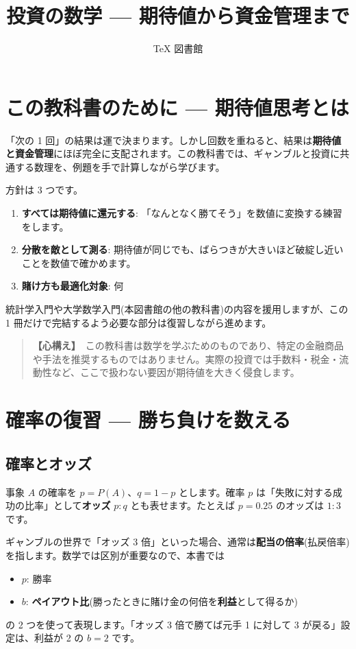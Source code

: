 \documentclass{article}
\title{投資の数学 — 期待値から資金管理まで}
\author{TeX 図書館}
\begin{document}
\section{この教科書のために — 期待値思考とは}

「次の 1 回」の結果は運で決まります。しかし回数を重ねると、結果は\textbf{期待値と資金管理}にほぼ完全に支配されます。この教科書では、ギャンブルと投資に共通する数理を、例題を手で計算しながら学びます。

方針は 3 つです。

\begin{enumerate}
\item \textbf{すべては期待値に還元する}: 「なんとなく勝てそう」を数値に変換する練習をします。
\item \textbf{分散を敵として測る}: 期待値が同じでも、ばらつきが大きいほど破綻し近いことを数値で確かめます。
\item \textbf{賭け方も最適化対象}: 何%
\end{enumerate}

統計学入門や大学数学入門(本図書館の他の教科書)の内容を援用しますが、この 1 冊だけで完結するよう必要な部分は復習しながら進めます。

\begin{quote}
\textbf{【心構え】}\ この教科書は数学を学ぶためのものであり、特定の金融商品や手法を推奨するものではありません。実際の投資では手数料・税金・流動性など、ここで扱わない要因が期待値を大きく侵食します。
\end{quote}

\section{確率の復習 — 勝ち負けを数える}

\subsection{確率とオッズ}

事象 \(A\) の確率を \(p = P(A)\)、\(q = 1 - p\) とします。確率 \(p\) は「失敗に対する成功の比率」として\textbf{オッズ} \(p : q\) とも表せます。たとえば \(p = 0.25\) のオッズは \(1:3\) です。

ギャンブルの世界で「オッズ 3 倍」といった場合、通常は\textbf{配当の倍率}(払戻倍率)を指します。数学では区別が重要なので、本書では
\begin{itemize}
\item \(p\): 勝率
\item \(b\): \textbf{ペイアウト比}(勝ったときに賭け金の何倍を\textbf{利益}として得るか)
\end{itemize}
の 2 つを使って表現します。「オッズ 3 倍で勝てば元手 1 に対して 3 が戻る」設定は、利益が 2 の \(b = 2\) です。
\end{document}
